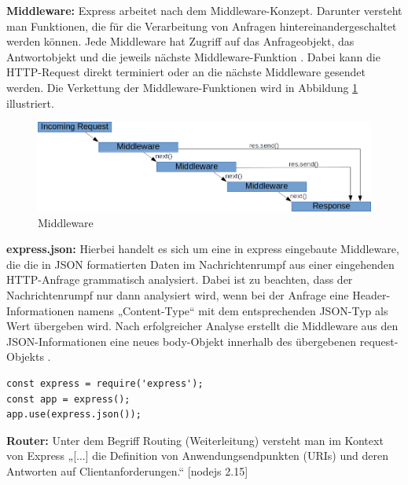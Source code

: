 \noindent
\textbf{Middleware:}
Express arbeitet nach dem Middleware-Konzept. Darunter versteht man Funktionen, die für die Verarbeitung von Anfragen hintereinandergeschaltet werden können. Jede Middleware hat Zugriff auf das Anfrageobjekt, das Antwortobjekt und die jeweils nächste Middleware-Funktion \cite{Node1.9}.
Dabei kann die HTTP-Request direkt terminiert oder an die nächste Middleware gesendet werden. Die Verkettung der Middleware-Funktionen wird in Abbildung \ref{fig:middleware} illustriert.
\newline

\begin{figure}[tbt]
\centering
\includegraphics[width=12cm]{images/nodejs_middleware.png}
\caption[Middleware]{Middleware \cite{Node1.2}}
\label{fig:middleware}
\end{figure}

%
%

\noindent
\textbf{express.json:}
Hierbei handelt es sich um eine in express eingebaute Middleware, die die in JSON formatierten Daten im Nachrichtenrumpf aus einer eingehenden HTTP-Anfrage grammatisch analysiert.  Dabei ist zu beachten, dass der Nachrichtenrumpf nur dann analysiert wird, wenn bei der Anfrage eine Header-Informationen namens „Content-Type“ mit dem entsprechenden JSON-Typ als Wert übergeben wird. Nach erfolgreicher Analyse erstellt die Middleware aus den JSON-Informationen eine neues body-Objekt innerhalb des übergebenen request-Objekts \cite{Node2.1}.
\newline

\begin{lstlisting}[caption=Express.json Middleware benutzen,label=lst:ExpressNutzen]
const express = require('express');
const app = express();
app.use(express.json());
\end{lstlisting}

%
%

\noindent
\textbf{Router:}
Unter dem Begriff Routing (Weiterleitung) versteht man im Kontext von Express „[...] die Definition von Anwendungsendpunkten (URIs) und deren Antworten auf Clientanforderungen.“ [nodejs 2.15]
\newline

